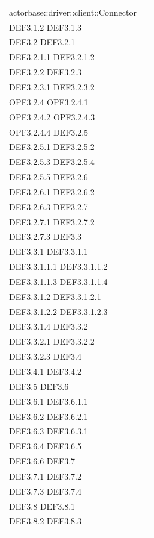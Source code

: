 \documentclass{scalatekids-article}
\begin{document}
\begin{longtable}[H]{|p{11.5cm}|p{5.5cm}|}
actorbase::driver::client::Connector & \multiLineCell[t]{DEF3.1 DEF3.1.1\\DEF3.1.2 DEF3.1.3\\DEF3.2 DEF3.2.1\\DEF3.2.1.1 DEF3.2.1.2\\DEF3.2.2 DEF3.2.3\\DEF3.2.3.1 DEF3.2.3.2\\OPF3.2.4 OPF3.2.4.1\\OPF3.2.4.2 OPF3.2.4.3\\OPF3.2.4.4 DEF3.2.5\\DEF3.2.5.1 DEF3.2.5.2\\DEF3.2.5.3 DEF3.2.5.4\\DEF3.2.5.5 DEF3.2.6\\DEF3.2.6.1 DEF3.2.6.2\\DEF3.2.6.3 DEF3.2.7\\DEF3.2.7.1 DEF3.2.7.2\\DEF3.2.7.3 DEF3.3\\DEF3.3.1 DEF3.3.1.1\\DEF3.3.1.1.1 DEF3.3.1.1.2\\DEF3.3.1.1.3 DEF3.3.1.1.4\\DEF3.3.1.2 DEF3.3.1.2.1\\DEF3.3.1.2.2 DEF3.3.1.2.3\\DEF3.3.1.4 DEF3.3.2\\DEF3.3.2.1 DEF3.3.2.2\\DEF3.3.2.3 DEF3.4\\DEF3.4.1 DEF3.4.2\\DEF3.5 DEF3.6\\DEF3.6.1 DEF3.6.1.1\\DEF3.6.2 DEF3.6.2.1\\DEF3.6.3 DEF3.6.3.1\\DEF3.6.4 DEF3.6.5\\DEF3.6.6 DEF3.7\\DEF3.7.1 DEF3.7.2\\DEF3.7.3 DEF3.7.4\\DEF3.8 DEF3.8.1\\DEF3.8.2 DEF3.8.3\\}\\
\hline

\end{longtable}
\end{document}
